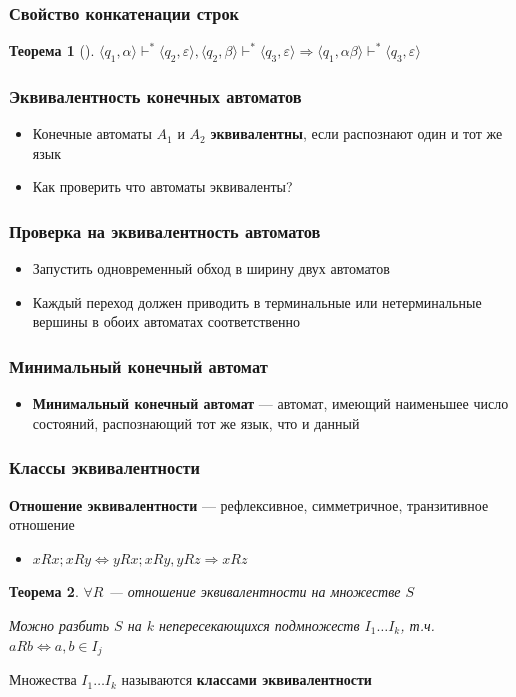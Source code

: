 \documentclass{beamer}
\newtheorem{rutheorem}{Теорема}
\begin{document}
\begin{frame}[fragile]
  \transwipe[direction=90]
  \frametitle{Свойство конкатенации строк}
  \begin{rutheorem}[]   
    $\langle q_1 , \alpha \rangle \vdash^* \langle q_2 , \varepsilon \rangle, \langle q_2 , \beta \rangle \vdash^* \langle q_3 , \varepsilon \rangle \Rightarrow \langle q_1 , \alpha \beta \rangle \vdash^* \langle q_3 , \varepsilon \rangle$
  \end{rutheorem}
\end{frame}


\begin{frame}[fragile]
  \transwipe[direction=90]
  \frametitle{Эквивалентность конечных автоматов}
  \begin{itemize}
    \item Конечные автоматы $A_1$ и $A_2$ \textbf{эквивалентны}, если распознают один и тот же язык
    \item Как проверить что автоматы эквиваленты?
  \end{itemize}
\end{frame}

\begin{frame}[fragile]
  \transwipe[direction=90]
  \frametitle{Проверка на эквивалентность автоматов}
  \begin{itemize}
    \item Запустить одновременный обход в ширину двух автоматов
    \item Каждый переход должен приводить в терминальные или нетерминальные вершины в обоих автоматах соответственно
  \end{itemize}
\end{frame}

\begin{frame}[fragile]
  \transwipe[direction=90]
  \frametitle{Минимальный конечный автомат}
  \begin{itemize}
    \item \textbf{Минимальный конечный автомат} --- автомат, имеющий наименьшее число состояний, распознающий тот же язык, что и данный
  \end{itemize}
\end{frame}

\begin{frame}[fragile]
  \transwipe[direction=90]
  \frametitle{Классы эквивалентности}
    \textbf{Отношение эквивалентности} --- рефлексивное, симметричное, транзитивное отношение
    \begin{itemize}
      \item $xRx; xRy \Leftrightarrow yRx; xRy, yRz \Rightarrow xRz$
    \end{itemize}
    
    \begin{rutheorem}
       $\forall R$ --- отношение эквивалентности на множестве $S$
      
      Можно разбить $S$ на $k$ непересекающихся подмножеств $I_1 \dots I_k$, т.ч. $aRb \Leftrightarrow a, b \in I_j$
    \end{rutheorem}
    
    Множества $I_1 \dots I_k$ называются \textbf{классами эквивалентности}
\end{frame}
\end{document}
